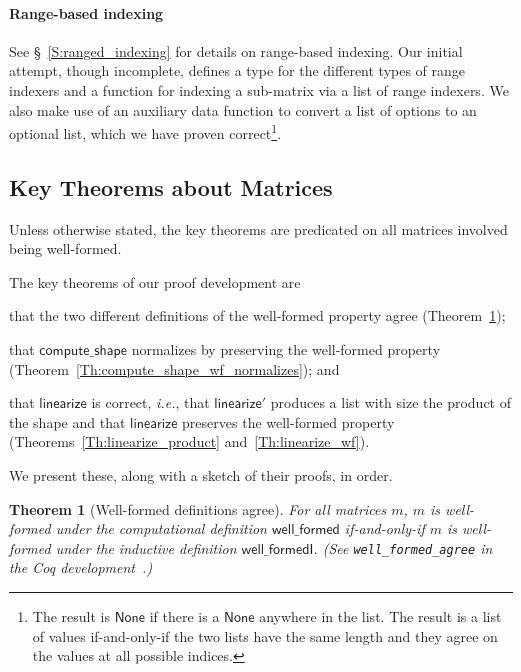 \documentclass[11pt,conference]{IEEEtran}
\newcommand{\func}[1]{\mathsf{#1}}
\theoremstyle{plain} %
\newtheorem{thm}{Theorem}[section]
\theoremstyle{definition}
\theoremstyle{remark}
\begin{document}
\paragraph{Range-based indexing} See \S~\ref{S:ranged_indexing} for details on
range-based indexing. Our initial attempt, though incomplete, defines a type for
the different types of range indexers and a function for indexing a sub-matrix
via a list of range indexers. We also make use of an auxiliary data function to
convert a list of options to an optional list, which we have proven
correct\footnote{The result is \(\func{None}\) if there is a \(\func{None}\)
anywhere in the list. The result is a list of values if-and-only-if the two
lists have the same length and they agree on the values at all possible
indices.}.

\subsection{Key Theorems about Matrices}\label{S:matrix_thm}

Unless otherwise stated, the key theorems are predicated on all matrices
involved being well-formed.

The key theorems of our proof development are
\begin{inlist}
\item that the two different definitions of the well-formed property agree
    (Theorem~\ref{Th:well_formed_agree});
\item that \(\func{compute\_shape}\) normalizes by preserving the well-formed
    property (Theorem~\ref{Th:compute_shape_wf_normalizes}); and
\item that \(\func{linearize}\) is correct, \textit{i.e.}, that
    \(\func{linearize'}\) produces a list with size the product of the shape and
    that \(\func{linearize}\) preserves the well-formed property
    (Theorems~\ref{Th:linearize_product} and~\ref{Th:linearize_wf}).
\end{inlist}
We present these, along with a sketch of their proofs, in order.

\begin{thm}[Well-formed definitions agree]\label{Th:well_formed_agree}
    For all matrices \(m\), \(m\) is well-formed under the computational
    definition \(\func{well\_formed}\) if-and-only-if \(m\) is well-formed under
    the inductive definition \(\func{well\_formedI}\). (See
    \texttt{well\_formed\_agree} in the Coq
    development~\cite{zelda_mosaic_proof}.)
\end{thm}
\end{document}
